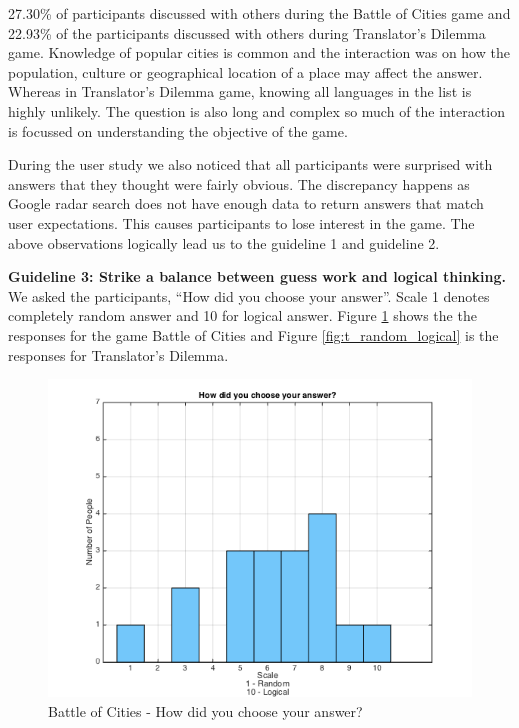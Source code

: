 \documentclass{sig-alternate}
\begin{document}
27.30\% of participants discussed with others during the Battle of Cities game and 22.93\% of the participants discussed with others during Translator's Dilemma game. Knowledge of popular 
cities is common and the interaction was on how the population, culture or geographical location of a place may affect the answer. Whereas in Translator's Dilemma game, knowing all languages in the list is highly unlikely. The question is also long and complex so much of the interaction is focussed on understanding the objective of the game.

During the user study we also noticed that all participants were surprised with answers that they thought were fairly obvious. The discrepancy happens as Google radar search does not have enough data to return answers that match user expectations. This causes participants to lose interest in the game. The above observations logically lead us to the guideline 1 and guideline 2.

\textbf{Guideline 3: Strike a balance between guess work and logical thinking.}
We asked the participants, ``How did you choose your answer''. Scale 1 denotes completely random answer and 10 for logical answer. Figure \ref{fig:p_random_logical} shows the the responses for the game Battle of Cities and Figure \ref{fig:t_random_logical} is the responses for Translator's Dilemma. 

\begin{figure}
	\includegraphics[width=\linewidth]{p_random_logical.png}
	\caption{Battle of Cities - How did you choose your answer?}
	\label{fig:p_random_logical}
\end{figure}
\end{document}
